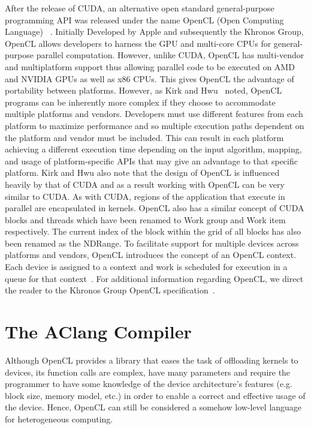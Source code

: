 \documentclass[Ingles]{ic-tese-v1}
\begin{document}
After the release of CUDA, an alternative open standard general-purpose programming
API was released under the name OpenCL (Open Computing Language) ~\cite{Kirk:2012}.
Initially Developed by Apple and subsequently the Khronos Group, OpenCL allows
developers to harness the GPU and multi-core CPUs for general-purpose parallel
computation. However, unlike CUDA, OpenCL has multi-vendor and multiplatform
support thus allowing parallel code to be executed on AMD and NVIDIA GPUs
as well as x86 CPUs. This gives OpenCL the advantage of portability between
platforms. However, as Kirk and Hwu~\cite{Kirk:2012} noted, OpenCL programs can be inherently more complex if they choose to accommodate multiple platforms and vendors.
Developers must use different features from each platform to maximize performance
and so multiple execution paths dependent on the platform and vendor must be
included. This can result in each platform achieving a different execution time
depending on the input algorithm, mapping, and usage of platform-specific APIs
that may give an advantage to that specific platform. Kirk and Hwu also note
that the design of OpenCL is influenced heavily by that of CUDA and as a result
working with OpenCL can be very similar to CUDA. As with CUDA, regions of
the application that execute in parallel are encapsulated in kernels. OpenCL also
has a similar concept of CUDA blocks and threads which have been renamed to
Work group and Work item respectively. The current index of the block within the
grid of all blocks has also been renamed as the NDRange. To facilitate support for
multiple devices across platforms and vendors, OpenCL introduces the concept of
an OpenCL context. Each device is assigned to a context and work is scheduled
for execution in a queue for that context~\cite{Kirk:2012}. For additional information regarding OpenCL, we direct the reader to the Khronos Group OpenCL specification~\cite{opencl}.

\section{The AClang Compiler}
\label{sec:AClang}

Although OpenCL provides  a library that eases the  task of offloading
kernels  to  devices,  its  function  calls  are  complex,  have  many
parameters and  require the programmer  to have some knowledge  of the
device architecture's  features (e.g. block size,  memory model, etc.)
in order to enable a correct and effective usage of the device. Hence,
OpenCL  can  still  be  considered a  somehow  low-level  language  for
heterogeneous computing.
\end{document}
